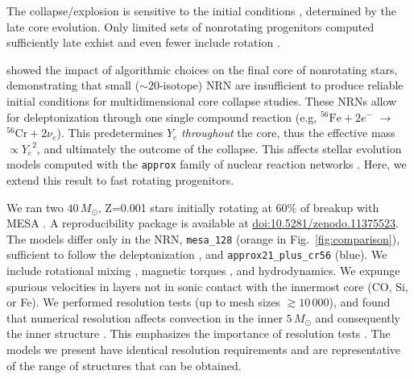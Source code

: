 \documentclass[twocolumn]{aastex63}
\DeclareRobustCommand{\Figref}[1]{Fig.~\ref{#1}}
\begin{document}
The collapse/explosion is sensitive to the initial conditions
\citep[e.g.,][]{ott:18, kuroda:18, burrows:23, nakamura:24},
determined by the late core evolution. Only limited sets of
nonrotating progenitors computed sufficiently late exhist
\citep{woosley:02, sukhbold:16, farmer:16, renzo:17, wang:24} and even
fewer include rotation \citep{heger:00,
  aguilera-dena:18}. %

\cite{farmer:16} showed the impact of algorithmic choices on the final
core of nonrotating stars, demonstrating that small
($\sim{}20$-isotope) NRN are insufficient to produce reliable initial
conditions for multidimensional core collapse studies. These NRNs
allow for deleptonization through one single compound reaction (e.g,
$^{56}\mathrm{Fe}+2e^{-}$ $\rightarrow$ $^{56}\mathrm{Cr}+2\nu_{e}$).
This predetermines $Y_e$ \emph{throughout} the core, thus
the effective \cite{chandrasekhar:31} mass $\propto {Y_e}^2$, and
ultimately the outcome of the collapse. This affects stellar evolution
models computed with the \texttt{approx} family of nuclear reaction
networks \citep{timmes:00}. Here, we extend this result to fast
rotating progenitors.

We ran two $40\,M_\odot$, Z=0.001 stars initially rotating at 60\% of
breakup with MESA \citep[][r24.03.1]{paxton:13, %
  jermyn:23}. A reproducibility package is
available at
\href{https://doi.org/10.5281/zenodo.11375523}{doi:10.5281/zenodo.11375523}.
The models differ only in the NRN, \texttt{mesa\_128} (orange in
\Figref{fig:comparison}), sufficient to follow the deleptonization
\citep{farmer:16}, and \texttt{approx21\_plus\_cr56} (blue). We
include rotational mixing \citep{heger:00}, magnetic torques
\citep{spruit:02}, and %
hydrodynamics. We expunge spurious velocities in layers not in sonic
contact with the innermost core (CO, Si, or Fe). We performed
resolution tests (up to mesh sizes $\gtrsim 10\,000$), and found that
numerical resolution affects convection in the inner $5\,M_\odot$ and
consequently the inner structure \citep[e.g.,][]{sukhbold:14,
  schneider:23}. This emphasizes the importance of resolution tests
\citep{farmer:16}. The models we present have identical
resolution requirements and are representative of the range of
structures that can be obtained.
\end{document}
